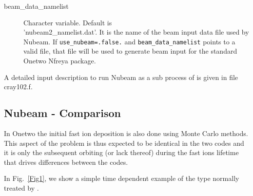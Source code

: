 \begin{description}
\begin{description}
            \item[beam\_data\_namelist]  Character variable.
                     Default is \\
                     \textsf{'}nubeam2\_namelist.dat\textsf{'}.  It is the name
                     of the beam input data file used by Nubeam.
                     If \texttt{use\_nubeam=.false.} and \texttt{beam\_data\_namelist}
                     points to a valid file, that file
                     will be used to generate beam input for the
                     standard Onetwo Nfreya package.
      \end{description}
   \end{description}


  
   A detailed input description to run Nubeam as a sub process
   of \ot is given in file cray102.f.



   \subsection{Nubeam - \ot Comparison}\label{compare} 
    In Onetwo the initial  fast ion deposition is also done using 
    Monte Carlo methods. This aspect of the problem  is thus expected
    to be identical in the two codes and it is only the subsequent
    orbiting (or lack thereof) during the fast ions lifetime that
    drives differences between the codes.

    In Fig.~\ref{Fig1}, we show a simple time dependent example of the 
    type normally treated by \ot. 
    
